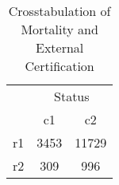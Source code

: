 \begin{table}[htbp]\centering
\caption{Crosstabulation of Mortality and External Certification}
\begin{tabular}{l*{2}{c}}
\hline\hline
                    &\multicolumn{2}{c}{Status}\\
                    &          c1&          c2\\
\hline
r1                  &        3453&       11729\\
r2                  &         309&         996\\
\hline\hline
\end{tabular}
\end{table}
